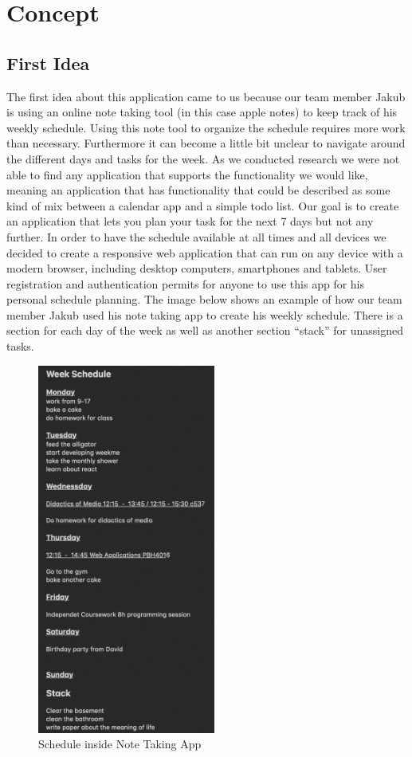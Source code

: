 \section{Concept}


\subsection{First Idea}


The first idea about this application came to us because our team member Jakub is using an online note taking tool  (in this case apple notes) to keep track of his weekly schedule. Using this note tool to organize the schedule requires more work than necessary. Furthermore it can become a little bit unclear to navigate around the different days and tasks for the week. As we conducted research we were not able to find any application that supports the functionality we would like, meaning an application that has functionality that could be described as some kind of mix between a calendar app and a simple todo list. Our goal is to create an application that lets you plan your task for the next 7 days but not any further. In order to have the schedule available at all times and all devices we decided to create a responsive web application that can run on any device with a modern browser, including desktop computers, smartphones and tablets. User registration and authentication permits for anyone to use this app for his personal schedule planning. The image below shows an example of how our team member Jakub used his note taking app to create his weekly schedule. There is a section for each day of the week as well as another section “stack” for unassigned tasks.   

	\begin{figure}[H] 
		\centering 
		\includegraphics[height=12.2cm]{figures/idea}     
		\caption{Schedule inside Note Taking App}     
	\end{figure}  

